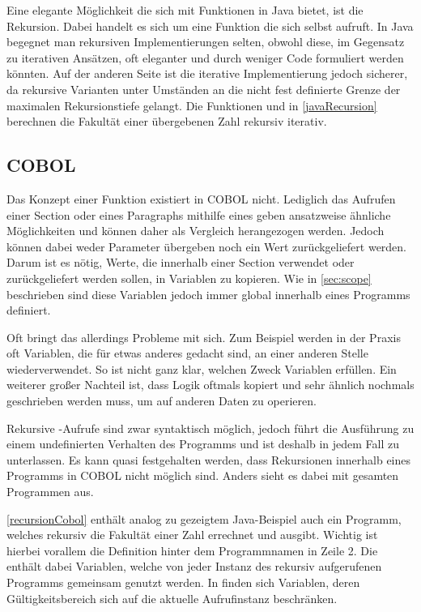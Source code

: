 
Eine elegante Möglichkeit die sich mit Funktionen in Java bietet, ist die Rekursion. Dabei handelt es sich um eine Funktion die sich selbst aufruft. In Java begegnet man rekursiven Implementierungen selten, obwohl diese, im Gegensatz zu iterativen Ansätzen, oft eleganter und durch weniger Code formuliert werden könnten. Auf der anderen Seite ist die iterative Implementierung jedoch sicherer, da rekursive Varianten unter Umständen an die nicht fest definierte Grenze der maximalen Rekursionstiefe gelangt. Die Funktionen  und  in \autoref{javaRecursion} berechnen die Fakultät einer übergebenen Zahl rekursiv \bzw iterativ.

\subsection*{COBOL}
Das Konzept einer Funktion existiert in COBOL nicht. Lediglich das Aufrufen einer Section oder eines Paragraphs mithilfe eines  geben ansatzweise ähnliche Möglichkeiten und können daher als Vergleich herangezogen werden. Jedoch können dabei weder Parameter übergeben noch ein Wert zurückgeliefert werden. Darum ist es nötig, Werte, die innerhalb einer Section verwendet oder zurückgeliefert werden sollen, in Variablen zu kopieren. Wie in \autoref{sec:scope} beschrieben sind diese Variablen jedoch immer global innerhalb eines Programms definiert.

Oft bringt das allerdings Probleme mit sich. Zum Beispiel werden in der Praxis oft Variablen, die für etwas anderes gedacht sind, an einer anderen Stelle wiederverwendet. So ist nicht ganz klar, welchen Zweck Variablen erfüllen. Ein weiterer großer Nachteil ist, dass Logik oftmals kopiert und sehr ähnlich nochmals geschrieben werden muss, um auf anderen Daten zu operieren.

Rekursive -Aufrufe sind zwar syntaktisch möglich, jedoch führt die Ausführung zu einem undefinierten Verhalten des Programms und ist deshalb in jedem Fall zu unterlassen. Es kann quasi festgehalten werden, dass Rekursionen innerhalb eines Programms in COBOL nicht möglich sind. Anders sieht es dabei mit gesamten Programmen aus.


\autoref{recursionCobol} enthält analog zu gezeigtem Java-Beispiel auch ein Programm, welches rekursiv die Fakultät einer Zahl errechnet und ausgibt. Wichtig ist hierbei vorallem die  Definition hinter dem Programmnamen in Zeile 2. Die  enthält dabei Variablen, welche von jeder Instanz des rekursiv aufgerufenen Programms gemeinsam genutzt werden. In  finden sich Variablen, deren Gültigkeitsbereich sich auf die aktuelle Aufrufinstanz beschränken.

